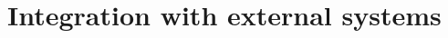 \documentclass[Main]{subfiles}
\begin{document}
\chapter{Integration with external systems}



\end{document}
